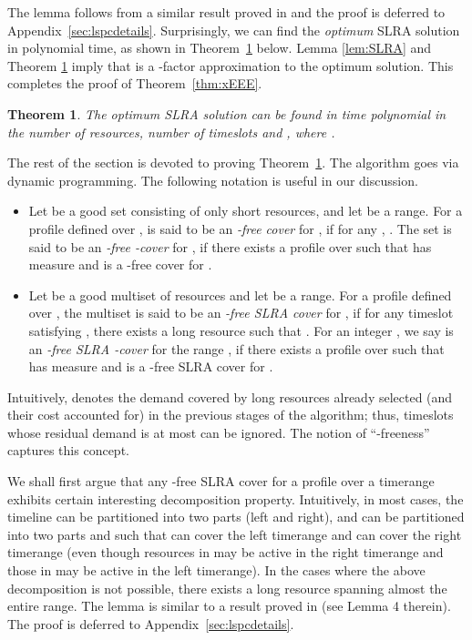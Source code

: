 \documentclass[11pt]{article}
\newtheorem{theorem}{Theorem}
\begin{document}
The lemma follows from a similar result proved in \cite{esa2011} and
the proof is deferred to Appendix~\ref{sec:lspcdetails}.
Surprisingly, we can find the {\em optimum} SLRA solution  in polynomial time, 
as shown in Theorem~\ref{thm:xGGG} below.
Lemma \ref{lem:SLRA} and Theorem \ref{thm:xGGG} imply that 
 is a -factor approximation to the optimum solution.
This completes the proof of Theorem~\ref{thm:xEEE}.

\begin{theorem}
\label{thm:xGGG}
The optimum SLRA solution  can be found in time polynomial in the number of resources,
number of timeslots and , where .
\end{theorem}

The rest of the section is devoted to proving Theorem~\ref{thm:xGGG}.
The algorithm goes via dynamic programming.
The following notation is useful in our discussion.
\begin{itemize}
\item
Let  be a good set consisting of only short resources, and let  be a range.
For a profile  defined over , 
  is said to be an {\em -free cover} for , if for any ,
.
The set  is said to be an {\em -free -cover} for ,
if there exists a profile  over   such that  has measure  and 
is a -free cover for .
\item 
Let  be a good multiset of resources and let  be a range.
For a profile  defined over , 
the multiset  is said to be an {\em -free SLRA cover} for , 
if for any timeslot  satisfying , 
there exists a long resource  such that .
For an integer , we say  is an {\em -free SLRA -cover} for the range ,
if there exists a profile  over  such that  has measure  and 
is a -free SLRA cover for .
\end{itemize}
Intuitively,  denotes the demand covered by long resources already selected (and their cost accounted for)
in the previous stages of the algorithm; thus, 
 timeslots whose residual demand is at most  can be ignored.
The notion of ``-freeness'' captures this concept.

We shall first argue that any -free SLRA cover  for a profile  over a timerange  exhibits 
certain interesting decomposition property.
Intuitively, in most cases, the timeline can be partitioned into two parts (left and right),
and  can be partitioned into two parts  and  such that 
 can cover the left timerange and  can cover the right timerange
(even though resources in  may be active in the right timerange and those in 
may be active in the left timerange).
In the cases where the above decomposition is not possible,
there exists a long resource spanning almost the entire range.
The lemma is similar to a result proved in \cite{esa2011} (see Lemma 4 therein).
The proof is deferred to Appendix~\ref{sec:lspcdetails}.
\end{document}
